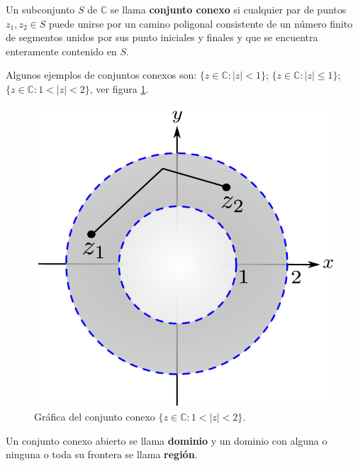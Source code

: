 \begin{defi}
Un subconjunto $S$ de $\mathbb{C}$ se llama \textbf{conjunto conexo} si cualquier par de puntos $z_1, z_2 \in S$ puede unirse por un camino poligonal consistente de un número finito de segmentos unidos por sus punto iniciales y finales y que se encuentra enteramente contenido en $S$. 
\end{defi}

\begin{ejemplo}
Algunos ejemplos de conjuntos conexos son: $\{z \in \mathbb{C} : |z| <1\}$; $\{z \in \mathbb{C} : |z| \leq 1\}$; $\{z \in \mathbb{C} : 1 < |z| <2 \}$, ver figura \ref{Conexo}.

\begin{figure}[H]
    \centering
    \includegraphics[scale=0.45]{Figuras/EjemploConexo.pdf}
    \caption{Gráfica del conjunto conexo $\{z \in \mathbb{C} : 1 < |z| <2 \}$.}
    \label{Conexo}
\end{figure}

\end{ejemplo}

\begin{defi}
Un conjunto conexo abierto se llama \textbf{dominio} y un dominio con alguna o ninguna o toda su frontera se llama \textbf{región}.
\end{defi}

